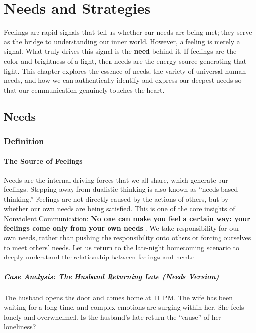 \chapter{Needs and Strategies}

Feelings are rapid signals that tell us whether our needs are being met;
they serve as the bridge to understanding our inner world.
However, a feeling is merely a signal.
What truly drives this signal is the \textbf{need} behind it.
If feelings are the color and brightness of a light, then needs are the
energy source generating that light.
This chapter explores the essence of needs, the variety of universal human
needs, and how we can authentically identify and express our deepest needs
so that our communication genuinely touches the heart.

\section{Needs}

\subsection{Definition}

\subsubsection{The Source of Feelings}

Needs are the internal driving forces that we all share, which generate our
feelings.
Stepping away from dualistic thinking is also known as ``needs-based thinking.''
Feelings are not directly caused by the actions of others, but by whether
our own needs are being satisfied.
This is one of the core insights of Nonviolent Communication:
\textbf{No one can make you feel a certain way; your feelings come only
from your own needs} \citep{rosenberg2003}.
We take responsibility for our own needs, rather than pushing the
responsibility onto others or forcing ourselves to meet others' needs.
Let us return to the late-night homecoming scenario to
deeply understand the relationship between feelings and needs:

\paragraph{Case Analysis: The Husband Returning Late (Needs Version)}

The husband opens the door and comes home at 11 PM.
The wife has been waiting for a long time, and complex emotions are surging
within her.
She feels lonely and overwhelmed.
Is the husband's late return the ``cause'' of her loneliness?

